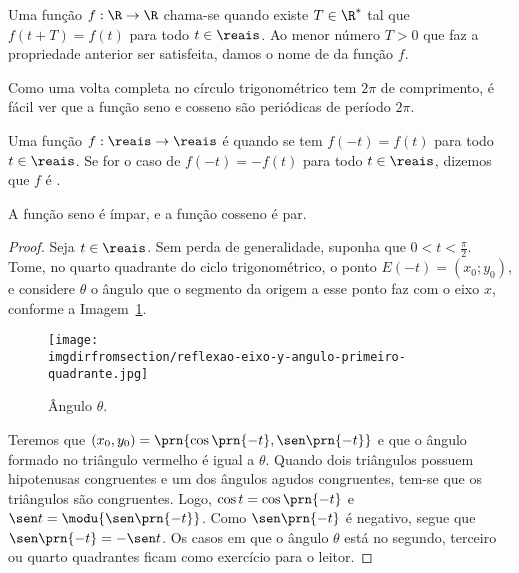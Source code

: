 \begin{definition}
\label{def:funcao-periodica}
    Uma função $f: \R \to \R$ chama-se  quando existe $T
\in \R^\ast$ tal que $f(t + T) = f(t)$ para todo $t \in \reais$. Ao
menor número $T>0$ que faz a propriedade anterior ser satisfeita,
damos o nome de  da função $f$.
\end{definition}

\begin{remark}
    Como uma volta completa no círculo trigonométrico tem $2 \pi$ de
comprimento, é fácil ver que a função seno e cosseno são periódicas
de período $2\pi$.
\end{remark}

\begin{definition}
\label{def:funcao-par-impar}
    Uma função $f: \reais \to \reais$ é  quando se tem $f(-t) = f(t)$
para todo $t\in \reais$. Se for o caso de $f(-t) = - f(t)$ para todo $t
\in \reais$, dizemos que $f$ é .
\end{definition}

 \begin{proposition}
     A função seno é ímpar, e a função cosseno é par.
 \end{proposition}

\begin{proof}
    Seja $t \in \reais$. Sem perda de generalidade, suponha que $0 < t < \frac \pi 2$.
    Tome, no quarto quadrante do ciclo trigonométrico, o ponto $E(-t) = (x_0; y_0)$, e considere 
    $\theta$ o ângulo que o segmento da origem a esse ponto faz com o eixo $x$, conforme a Imagem~\ref{img:reflexao-eixo-y-angulo-primeiro-quadrante}.
    \begin{figure}[H]
        \centering
        \texttt{[image: \\imgdirfromsection/reflexao-eixo-y-angulo-primeiro-quadrante.jpg]}
        \caption{Ângulo $\theta$.}
        \label{img:reflexao-eixo-y-angulo-primeiro-quadrante}
    \end{figure}
    Teremos que $(x_0, y_0) =\prn{\cos\prn{-t}, \sen\prn{-t}}$ e que o ângulo formado no triângulo vermelho é igual a $\theta$.
    Quando dois triângulos possuem hipotenusas congruentes e um dos ângulos agudos congruentes, tem-se que os triângulos são congruentes.
    Logo, $\cos t = \cos\prn{-t}$ e $\sen t = \modu{\sen\prn{- t}}$. Como $\sen\prn{-t}$ é negativo, segue que 
    $\sen\prn{-t} = -\sen t$. Os casos em que o ângulo $\theta$ está no segundo, terceiro ou quarto quadrantes ficam como exercício 
    para o leitor.
\end{proof}

